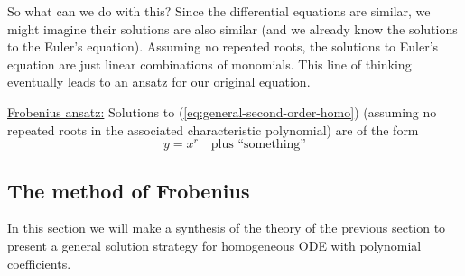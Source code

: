 \documentclass[11pt, letterpaper, oneside]{article}     %
\numberwithin{equation}{subsection}
\theoremstyle{definition}
\numberwithin{theorem}{section}
\theoremstyle{remark}
\begin{document}
\begin{enumerate}
  So what can we do with this? Since the differential equations are similar, we might imagine their solutions are also similar (and we already know the solutions to the Euler's equation). Assuming no repeated roots, the solutions to Euler's equation are just linear combinations of monomials. This line of thinking eventually leads to an ansatz for our original equation.

  \underline{Frobenius ansatz:} Solutions to (\ref{eq:general-second-order-homo}) (assuming no repeated roots in the associated characteristic polynomial) are of the form
  \begin{equation}
    y = x^r \quad\text{plus ``something''}
  \end{equation}

\end{enumerate}

\subsection{The method of Frobenius}

In this section we will make a synthesis of the theory of the previous section to present a general solution strategy for homogeneous ODE with polynomial coefficients.
\end{document}
